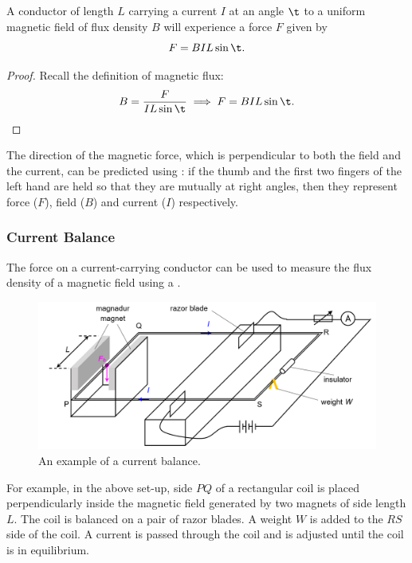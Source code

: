 \begin{proposition}
    A conductor of length $L$ carrying a current $I$ at an angle $\t$ to a uniform magnetic field of flux density $B$ will experience a force $F$ given by \[F = BIL\sin\t.\]
\end{proposition}
\begin{proof}
    Recall the definition of magnetic flux: \[B = \frac{F}{IL\sin\t} \implies F = BIL\sin\t.\]
\end{proof}

The direction of the magnetic force, which is perpendicular to both the field and the current, can be predicted using : if the thumb and the first two fingers of the left hand are held so that they are mutually at right angles, then they represent force ($F$), field ($B$) and current ($I$) respectively.

\subsubsection{Current Balance}

The force on a current-carrying conductor can be used to measure the flux density of a magnetic field using a .

\begin{figure}[H]
    \centering
    \includegraphics[scale=0.7]{media/Current Balance.png}
    \caption{An example of a current balance.\protect\footnotemark}
\end{figure}

For example, in the above set-up, side $PQ$ of a rectangular coil is placed perpendicularly inside the magnetic field generated by two magnets of side length $L$. The coil is balanced on a pair of razor blades. A weight $W$ is added to the $RS$ side of the coil. A current is passed through the coil and is adjusted until the coil is in equilibrium.

